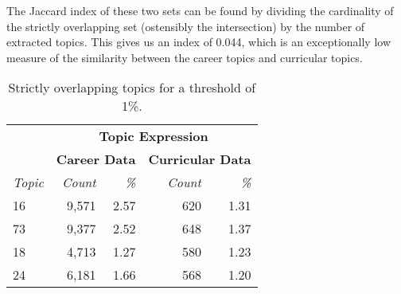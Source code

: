 The Jaccard index of these two sets can be found by dividing the cardinality of the strictly overlapping set (ostensibly the intersection) by the number of extracted topics.
This gives us an index of 0.044, which is an exceptionally low measure of the similarity between the career topics and curricular topics.

\begin{table}
  \centering
  \begin{tabular}{l r r r r}
    & \multicolumn{4}{c}{\small{\textbf{Topic Expression}}} \\
    & \multicolumn{2}{c}{\small{\textbf{Career Data}}} & \multicolumn{2}{c}{\small{\textbf{Curricular Data}}} \\
    {\small\textit{Topic}} & {\small\textit{Count}} & {\small\textit{\%}} & {\small\textit{Count}} & {\small\textit{\%}} \\
    \hline
    16 & 9,571 & 2.57 & 620 & 1.31 \\
    73 & 9,377 & 2.52 & 648 & 1.37 \\
    18 & 4,713 & 1.27 & 580 & 1.23 \\
    24 & 6,181 & 1.66 & 568 & 1.20
  \end{tabular}
  \caption{Strictly overlapping topics for a threshold of 1\%.}~\label{tab:overlap}
\end{table}
